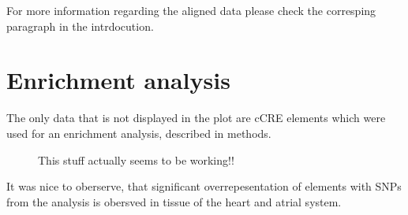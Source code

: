     For more information regarding the aligned data please check the corresping paragraph in the intrdocution.

\section{Enrichment analysis}
\label{sec:result_enrichment}
The only data that is not displayed in the plot are cCRE elements which were used for an enrichment analysis, described in methods.

\begin{figure}[h]
\capstart
    \centering
	

	\begin{minipage}{\captionwidth}
		\caption[enrichemtn]{ \newline This stuff actually seems to be working!!}
		\label{fig:qPCR}
	\end{minipage}
\end{figure}

It was nice to oberserve, that significant overrepesentation of elements with SNPs from the analysis is obersved in tissue of the heart and atrial system.
